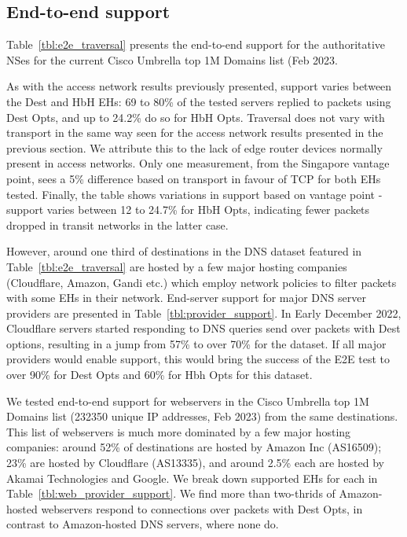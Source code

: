 \documentclass[conference]{IEEEtran}
\begin{document}
\subsection{End-to-end support}
\label{subsec:e2esupport}

Table~\ref{tbl:e2e_traversal} presents the end-to-end support for the authoritative NSes for the current Cisco Umbrella top 1M Domains list (Feb 2023.

As with the access network results previously presented, support varies between the Dest and HbH EHs: 69 to 80\% of the tested servers replied to packets using Dest Opts, and up to 24.2\% do so for HbH Opts. Traversal does not vary with transport in the same way seen for the access network results presented in the previous section. We attribute this to the lack of edge router devices normally present in access networks. Only one measurement, from the Singapore vantage point, sees a 5\% difference based on transport in favour of TCP for both EHs tested.
Finally, the table shows variations in support based on vantage point - support varies between 12 to 24.7\% for HbH Opts, indicating fewer packets dropped in transit networks in the latter case.

However, around one third of destinations in the DNS dataset featured in Table~\ref{tbl:e2e_traversal} are hosted by a few major hosting companies (Cloudflare, Amazon, Gandi etc.) which employ network policies to filter packets with some EHs in their network. End-server support for major DNS server providers are presented in Table~\ref{tbl:provider_support}. In Early December 2022, Cloudflare servers started responding to DNS queries send over packets with Dest options, resulting in a jump from 57\% to over 70\% for the dataset. If all major providers would enable support, this would bring the success of the E2E test to over 90\% for Dest Opts and 60\% for Hbh Opts for this dataset.

We tested end-to-end support for webservers in the Cisco Umbrella top 1M Domains list (232350 unique IP addresses, Feb 2023) from the same destinations. This list of webservers is much more dominated by a few major hosting companies: around 52\% of destinations are hosted by Amazon Inc (AS16509); 23\% are hosted by Cloudflare (AS13335), and around 2.5\% each are hosted by Akamai Technologies and Google. We break down supported EHs for each in Table~\ref{tbl:web_provider_support}. We find more than two-thrids of Amazon-hosted webservers respond to connections over packets with Dest Opts, in contrast to Amazon-hosted DNS servers, where none do. 
\end{document}
